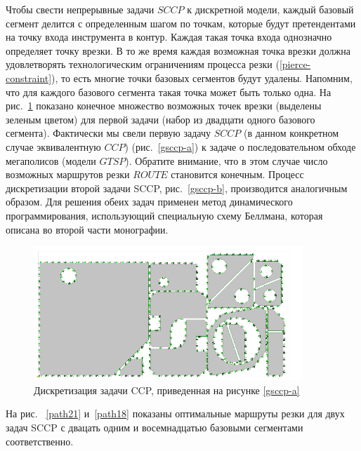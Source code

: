 \documentclass[11pt,twoside,openany]{report}
\begin{document}
Чтобы свести непрерывные задачи $SCCP$
к дискретной модели,
каждый базовый сегмент делится с определенным шагом по точкам,
которые будут претендентами на точку входа инструмента в контур.
Каждая такая точка входа однозначно определяет точку врезки.
В то же время каждая возможная точка врезки должна
удовлетворять технологическим ограничениям процесса резки
(\ref{pierce-constraint}),
то есть многие точки базовых сегментов будут удалены.
Напомним, что для каждого базового сегмента
такая точка может быть только одна.
На рис.~\ref{discrete21}
показано конечное множество возможных точек врезки
(выделены зеленым цветом)
для первой задачи
(набор из двадцати одного базового сегмента).
Фактически мы свели первую задачу $SCCP$
(в данном конкретном случае эквивалентную $CCP$)
(рис.~\ref{gsccp-a})
к задаче о последовательном обходе мегаполисов (модели $GTSP$).
Обратите внимание,
что в этом случае число возможных маршрутов резки $ROUTE$
становится конечным.
Процесс дискретизации второй задачи SCCP,
рис.~\ref{gsccp-b},
производится аналогичным образом.
Для решения обеих задач применен метод динамического программирования,
использующий специальную схему Беллмана,
которая описана во второй части монографии.

\begin{figure}[h]
  \begin{center}
  \includegraphics[width=0.9\textwidth]{discrete21.png}
  \caption{Дискретизация задачи CCP, приведенная на рисунке \ref{gsccp-a}}
  \label{discrete21}
  \end{center}
\end{figure}

На рис. ~\ref{path21}
и~\ref{path18}
показаны оптимальные маршруты резки для двух задач SCCP
с двацать одним и восемнадцатью
базовыми сегментами соответственно.
\end{document}
